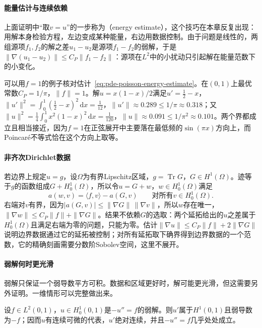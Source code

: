 \paragraph{能量估计与连续依赖}
上面证明中“取$v=u$”的一步称为（energy estimate），这个技巧在本章反复出现：用解本身检验方程，左边变成某种能量，右边用数据控制。由于问题是线性的，两组源项$f_1,f_2$的解之差$u_1-u_2$是源项$f_1-f_2$的弱解，于是$\|\nabla(u_1-u_2)\|\leq C_P\|f_1-f_2\|$：源项在$L^2$中的小扰动只引起解在能量范数下的小变化。

可以用$f=1$的例子核对估计~\eqref{eq:pde-poisson-energy-estimate}。在$(0,1)$上最优常数$C_P=1/\pi$，$\|f\|=1$。解$u=x(1-x)/2$满足$u'=\tfrac12-x$，$\|u'\|^2=\int_0^1(\tfrac12-x)^2\,\mathrm dx=\tfrac1{12}$，$\|u'\|\approx0.289\leq1/\pi\approx0.318$；又$\|u\|^2=\tfrac14\int_0^1x^2(1-x)^2\,\mathrm dx=\tfrac1{120}$，$\|u\|\approx0.091\leq1/\pi^2\approx0.101$。两个界都成立且相当接近，因为$f=1$在正弦展开中主要落在最低频的$\sin(\pi x)$方向上，而Poincaré不等式恰在这个方向上取等。

\paragraph{非齐次Dirichlet数据}
若边界上规定$u=g$，设$\Omega$为有界Lipschitz区域，$g=\operatorname{Tr}G$，$G\in H^1(\Omega)$。迹等于$g$的函数组成$G+H_0^1(\Omega)$，所以令$u=G+w$，$w\in H_0^1(\Omega)$满足
\[
  a(w,v)=\langle f,v\rangle-a(G,v)\qquad\text{对所有}v\in H_0^1(\Omega).
\]
右端对$v$有界，因为$|a(G,v)|\leq\|\nabla G\|\,\|\nabla v\|$，所以$w$存在唯一，$\|\nabla w\|\leq C_P\|f\|+\|\nabla G\|$。结果不依赖$G$的选取：两个延拓给出的$u$之差属于$H_0^1(\Omega)$且满足右端为零的问题，只能为零。估计$\|\nabla u\|\leq C_P\|f\|+2\|\nabla G\|$说明边界数据通过它的延拓被控制；对所有延拓取下确界得到边界数据的一个范数，它的精确刻画需要分数阶Sobolev空间，这里不展开。

\paragraph{弱解何时更光滑}
弱解只保证一个弱导数平方可积。数据和区域更好时，解可能更光滑，但这需要另外证明。一维情形可以完整做出来。

\begin{theorem}[一维弱解的正则性]
\label{thm:pde-regularity-1d}
设$f\in L^2(0,1)$，$u\in H_0^1(0,1)$是$-u''=f$的弱解。则$u'$属于$H^1(0,1)$且弱导数为$-f$；因而$u$有连续可微的代表，$u'$绝对连续，并且$-u''=f$几乎处处成立。
\end{theorem}

